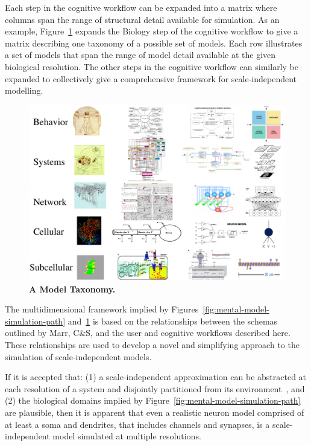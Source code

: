 \documentclass{article}
\begin{document}
Each step in the cognitive workflow can be expanded into a matrix where columns span the range of structural detail available for simulation.  As an example, Figure~\ref{fig:multi-scale-taxonomy} expands the Biology step of the cognitive workflow to give a matrix describing one taxonomy of a possible set of models.  Each row illustrates a set of models that span the range of model detail available at the given biological resolution.  The other steps in the cognitive workflow can similarly be expanded to collectively give a comprehensive framework for scale-independent modelling. 

\begin{figure}[h!t]
  \begin{center}
    \includegraphics[width=5in]{figures/multi-scale-taxonomy-no-arrows-no-texts.eps}
  \end{center}
  \caption{ {\bf A Model Taxonomy.} }
  \label{fig:multi-scale-taxonomy}
\end{figure}

The multidimensional framework implied by Figures~\ref{fig:mental-model-simulation-path} and~\ref{fig:multi-scale-taxonomy} is based on the relationships between the schemas outlined by Marr, C\&S, and the user and cognitive workflows described here. These relationships are used to develop a novel and simplifying approach to the simulation of scale-independent models.



If it is accepted that: (1) a scale-independent approximation can be abstracted at each resolution of a system and disjointly partitioned from its environment~\cite{Bertalanffy:1973zr, Heylighen:2006vn}, and (2) the biological domains implied by Figure~\ref{fig:mental-model-simulation-path} are plausible, then it is apparent that even a realistic neuron model comprised of at least a soma and dendrites, that includes channels and synapses, is a scale-independent model simulated at multiple resolutions.
\end{document}
